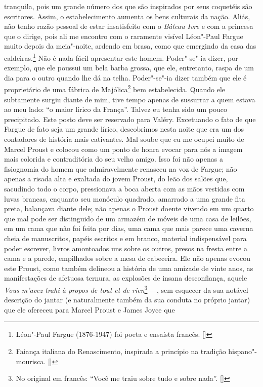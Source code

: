 tranquila, pois um grande número dos que são inspirados por seus
coquetéis são escritores. Assim, o estabelecimento aumenta os bens
culturais da nação. Aliás, não tenho razão pessoal de estar insatisfeito
com o \emph{Bâteau Ivre} e com a princesa que o dirige, pois ali me
encontro com o raramente visível Léon"-Paul Fargue muito depois da
meia"-noite, ardendo em brasa, como que emergindo da casa das
caldeiras.\footnote{Léon"-Paul Fargue (1876-1947) foi poeta e
  ensaísta francês. []} Não é nada fácil apresentar este homem.
Poder"-se"-ia dizer, por exemplo, que ele poussui um bela barba grossa,
que ele, entretanto, raspa de um dia para o outro quando lhe dá na
telha. Poder"-se"-ia dizer também que ele é proprietário de uma fábrica de
Majólica\footnote{Faiança italiana do Renascimento, inspirada a
  princípio na tradição hispano"-mourisca. []} bem estabelecida. Quando ele
subtamente surgiu diante de mim, tive tempo apenas de sussurrar a quem
estava ao meu lado: ``o maior lírico da França''. Talvez eu tenha sido
um pouco precipitado. Este posto deve ser reservado para Valéry.
Excetuando o fato de que Fargue de fato seja um grande lírico,
descobrimos nesta noite que era um dos contadores de história mais
cativantes. Mal soube que eu me ocupei muito de Marcel Proust e colocou
como um ponto de honra evocar para nós a imagem mais colorida e
contraditória do seu velho amigo. Isso foi não apenas a fisiognomia do
homem que admiravelmente renasceu na voz de Fargue; não apenas a risada
alta e exaltada do jovem Proust, do leão dos salões que, sacudindo todo
o corpo, pressionava a boca aberta com as mãos vestidas com luvas
brancas, enquanto seu monóculo quadrado, amarrado a uma grande fita
preta, balançava diante dele; não apenas o Proust doente vivendo em um
quarto que mal pode ser distinguido de um armazém de móveis de uma casa
de leilões, em um cama que não foi feita por dias, uma cama que mais
parece uma caverna cheia de manuscritos, papéis escritos e em branco,
material indispensável para poder escrever, livros amontoados uns sobre
os outros, presos na fresta entre a cama e a parede, empilhados sobre a
mesa de cabeceira. Ele não apenas evocou este Proust, como também
delineou a história de uma amizade de vinte anos, as manifestações de
afetuosa ternura, as explosões de insana desconfiança, aquele \emph{Vous
m'avez trahi à propos de tout et de rien}\footnote{No original em
  francês: ``Você me traiu sobre tudo e sobre nada''. []} ---, sem esquecer
da sua notável descrição do jantar (e naturalmente também da sua conduta
no próprio jantar) que ele ofereceu para Marcel Proust e James Joyce que
